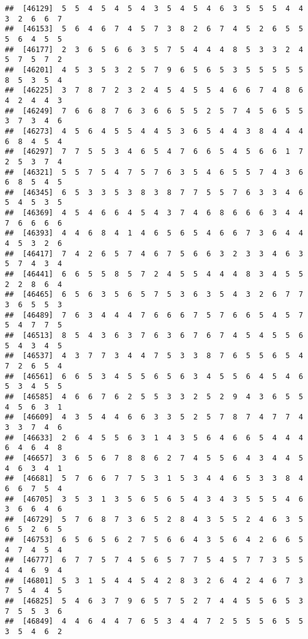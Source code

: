 \documentclass[
]{book}
\begin{document}
\begin{verbatim}
##  [46129]  5  5  4  5  4  5  4  3  5  4  5  4  6  3  5  5  5  4  4  3  2  6  6  7
##  [46153]  5  6  4  6  7  4  5  7  3  8  2  6  7  4  5  2  6  5  5  5  6  4  5  5
##  [46177]  2  3  6  5  6  6  3  5  7  5  4  4  4  8  5  3  3  2  4  5  7  5  7  2
##  [46201]  4  5  3  5  3  2  5  7  9  6  5  6  5  3  5  5  5  5  5  8  5  3  5  4
##  [46225]  3  7  8  7  2  3  2  4  5  4  5  5  4  6  6  7  4  8  6  4  2  4  4  3
##  [46249]  7  6  6  8  7  6  3  6  6  5  5  2  5  7  4  5  6  5  5  3  7  3  4  6
##  [46273]  4  5  6  4  5  5  4  4  5  3  6  5  4  4  3  8  4  4  4  6  8  4  5  4
##  [46297]  7  7  5  5  3  4  6  5  4  7  6  6  5  4  5  6  6  1  7  2  5  3  7  4
##  [46321]  5  5  7  5  4  7  5  7  6  3  5  4  6  5  5  7  4  3  6  6  8  5  4  5
##  [46345]  6  5  3  3  5  3  8  3  8  7  7  5  5  7  6  3  3  4  6  5  4  5  3  5
##  [46369]  4  5  4  6  6  4  5  4  3  7  4  6  8  6  6  6  3  4  4  7  6  6  6  6
##  [46393]  4  4  6  8  4  1  4  6  5  6  5  4  6  6  7  3  6  4  4  4  5  3  2  6
##  [46417]  7  4  2  6  5  7  4  6  7  5  6  6  3  2  3  3  4  6  3  5  7  4  3  4
##  [46441]  6  6  5  5  8  5  7  2  4  5  5  4  4  4  8  3  4  5  5  2  2  8  6  4
##  [46465]  6  5  6  3  5  6  5  7  5  3  6  3  5  4  3  2  6  7  7  3  6  5  5  3
##  [46489]  7  6  3  4  4  4  7  6  6  6  7  5  7  6  6  5  4  5  7  5  4  7  7  5
##  [46513]  8  5  4  3  6  3  7  6  3  6  7  6  7  4  5  4  5  5  6  5  4  3  4  5
##  [46537]  4  3  7  7  3  4  4  7  5  3  3  8  7  6  5  5  6  5  4  7  2  6  5  4
##  [46561]  6  6  5  3  4  5  5  6  5  6  3  4  5  5  6  4  5  4  6  5  3  4  5  5
##  [46585]  4  6  6  7  6  2  5  5  3  3  2  5  2  9  4  3  6  5  5  4  5  6  3  1
##  [46609]  4  3  5  4  4  6  6  3  3  5  2  5  7  8  7  4  7  7  4  3  3  7  4  6
##  [46633]  2  6  4  5  5  6  3  1  4  3  5  6  4  6  6  5  4  4  4  6  4  6  4  8
##  [46657]  3  6  5  6  7  8  8  6  2  7  4  5  5  6  4  3  4  4  5  4  6  3  4  1
##  [46681]  5  7  6  6  7  7  5  3  1  5  3  4  4  6  5  3  3  8  4  6  6  7  5  4
##  [46705]  3  5  3  1  3  5  6  5  6  5  4  3  4  3  5  5  5  4  6  3  6  6  4  6
##  [46729]  5  7  6  8  7  3  6  5  2  8  4  3  5  5  2  4  6  3  5  6  5  2  6  5
##  [46753]  6  5  6  5  6  2  7  5  6  6  4  3  5  6  4  2  6  6  5  4  7  4  5  4
##  [46777]  6  7  7  5  7  4  5  6  5  7  7  5  4  5  7  7  3  5  5  4  4  6  9  4
##  [46801]  5  3  1  5  4  4  5  4  2  8  3  2  6  4  2  4  6  7  3  7  5  4  4  5
##  [46825]  5  4  6  3  7  9  6  5  7  5  2  7  4  4  5  5  6  5  3  7  5  5  3  6
##  [46849]  4  4  6  4  4  7  6  5  3  4  4  7  2  5  5  5  6  5  5  3  5  4  6  2

\end{verbatim}
\end{document}
